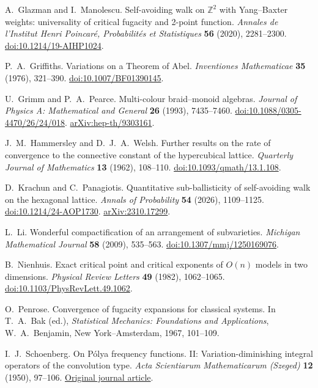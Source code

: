 A.~Glazman and I.~Manolescu.
Self-avoiding walk on $\mathbb Z^2$ with Yang--Baxter weights:
universality of critical fugacity and 2-point function.
\emph{Annales de l'Institut Henri Poincar\'e, Probabilit\'es et Statistiques}
\textbf{56} (2020), 2281--2300.
\href{https://doi.org/10.1214/19-AIHP1024}{doi:10.1214/19-AIHP1024}.

P.~A.~Griffiths.
Variations on a Theorem of Abel.
\emph{Inventiones Mathematicae} \textbf{35} (1976), 321--390.
\href{https://doi.org/10.1007/BF01390145}{doi:10.1007/BF01390145}.

U.~Grimm and P.~A.~Pearce.
Multi-colour braid--monoid algebras.
\emph{Journal of Physics A: Mathematical and General} \textbf{26} (1993), 7435--7460.
\href{https://doi.org/10.1088/0305-4470/26/24/018}{doi:10.1088/0305-4470/26/24/018}.
\href{https://arxiv.org/abs/hep-th/9303161}{arXiv:hep-th/9303161}.

J.~M.~Hammersley and D.~J.~A.~Welsh.
Further results on the rate of convergence to the connective constant of
the hypercubical lattice.
\emph{Quarterly Journal of Mathematics} \textbf{13} (1962), 108--110.
\href{https://doi.org/10.1093/qmath/13.1.108}{doi:10.1093/qmath/13.1.108}.

D.~Krachun and C.~Panagiotis.
Quantitative sub-ballisticity of self-avoiding walk on the hexagonal lattice.
\emph{Annals of Probability} \textbf{54} (2026), 1109--1125.
\href{https://doi.org/10.1214/24-AOP1730}{doi:10.1214/24-AOP1730}.
\href{https://arxiv.org/abs/2310.17299}{arXiv:2310.17299}.

L.~Li.
Wonderful compactification of an arrangement of subvarieties.
\emph{Michigan Mathematical Journal} \textbf{58} (2009), 535--563.
\href{https://doi.org/10.1307/mmj/1250169076}{doi:10.1307/mmj/1250169076}.

B.~Nienhuis.
Exact critical point and critical exponents of $O(n)$ models in two dimensions.
\emph{Physical Review Letters} \textbf{49} (1982), 1062--1065.
\href{https://doi.org/10.1103/PhysRevLett.49.1062}{doi:10.1103/PhysRevLett.49.1062}.

O.~Penrose.
Convergence of fugacity expansions for classical systems.
In T.~A.~Bak (ed.), \emph{Statistical Mechanics: Foundations and Applications},
W.~A.~Benjamin, New York--Amsterdam, 1967, 101--109.

I.~J.~Schoenberg.
On P\'olya frequency functions. II: Variation-diminishing integral operators of the convolution type.
\emph{Acta Scientiarum Mathematicarum (Szeged)} \textbf{12} (1950), 97--106.
\href{https://acta.bibl.u-szeged.hu/13626/1/math_012_pars_b_097-106.pdf}{Original journal article}.

